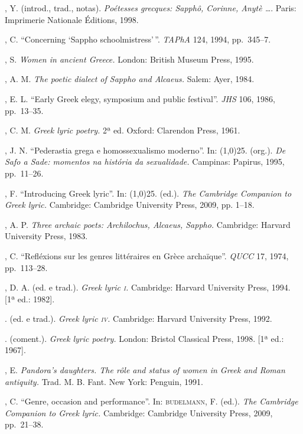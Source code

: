 

\begin{bibliohedra}
, Y. (introd., trad., notas). \textit{Poétesses grecques:
Sapphô, Corinne, Anytè \ldots{}}. Paris: Imprimerie Nationale Éditions, 1998.

, C. “Concerning ‘Sappho schoolmistress’\,”. \textit{TAPhA} 124,
1994, pp.~345--7.

, S. \textit{Women in ancient Greece.} London: British Museum
Press, 1995.

, A. M. \textit{The poetic dialect of Sappho and Alcaeus.} Salem:
Ayer, 1984. 

, E. L. “Early Greek elegy, symposium and public festival”.
\textit{JHS} 106, 1986, pp.~13--35.

, C. M. \textit{Greek lyric poetry.} 2ª
ed. Oxford: Clarendon Press, 1961.

, J. N. “Pederastia grega e homossexualismo moderno”. In:
\line(1,0){25}. (org.). \textit{De Safo a Sade: momentos na história da
sexualidade.} Campinas: Papirus, 1995, pp.~11--26.

, F. “Introducing Greek lyric”. In:
\line(1,0){25}. (ed.). \textit{The Cambridge
Companion to Greek lyric.} Cambridge: Cambridge University Press, 2009, pp.
1--18.

, A. P. \textit{Three archaic poets: Archilochus, Alcaeus,
Sappho.} Cambridge: Harvard University Press, 1983. 

, C. “Refléxions sur les genres littéraires en Grèce archaïque”.
\textit{QUCC} 17, 1974, pp.~113--28.

, D. A. (ed. e trad.). \textit{Greek lyric \textsc{i}.} Cambridge:
Harvard University Press, 1994. [1ª ed.: 1982].

\titidem. (ed. e trad.). \textit{Greek lyric \textsc{iv}.} Cambridge: Harvard
University Press, 1992.

\titidem. (coment.). \textit{Greek lyric poetry.} London: Bristol
Classical Press, 1998. [1ª ed.: 1967]. 

, E. \textit{Pandora’s daughters. The rôle and status of
women in Greek and Roman antiquity.} Trad. M. B. Fant. New York: Penguin, 1991.

, C. “Genre, occasion and performance”. In:
\textsc{budelmann}, F. (ed.). \textit{The Cambridge Companion to Greek
lyric.} Cambridge: Cambridge University Press, 2009, pp.~21--38.


\end{bibliohedra}
